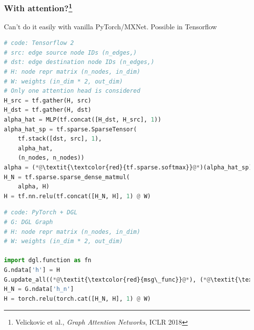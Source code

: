 \documentclass[10pt,aspectratio=169]{beamer}
\begin{document}
	\begin{frame}[fragile]
		\frametitle{With attention?\footnote{Velickovic et al., \emph{Graph Attention Networks}, ICLR 2018}}
		Can't do it easily with vanilla PyTorch/MXNet.  Possible in Tensorflow
		\begin{minipage}{0.5\textwidth}
\begin{lstlisting}[language=Python]
# code: Tensorflow 2
# src: edge source node IDs (n_edges,)
# dst: edge destination node IDs (n_edges,)
# H: node repr matrix (n_nodes, in_dim)
# W: weights (in_dim * 2, out_dim)
# Only one attention head is considered
H_src = tf.gather(H, src)
H_dst = tf.gather(H, dst)
alpha_hat = MLP(tf.concat([H_dst, H_src], 1))
alpha_hat_sp = tf.sparse.SparseTensor(
    tf.stack([dst, src], 1),
    alpha_hat,
    (n_nodes, n_nodes))
alpha = (*@\textit{\textcolor{red}{tf.sparse.softmax}}@*)(alpha_hat_sp)
H_N = tf.sparse.sparse_dense_matmul(
    alpha, H)
H = tf.nn.relu(tf.concat([H_N, H], 1) @ W)
\end{lstlisting}
		\end{minipage}%
		\begin{minipage}{0.5\textwidth}
\begin{lstlisting}[language=Python]
# code: PyTorch + DGL
# G: DGL Graph
# H: node repr matrix (n_nodes, in_dim)
# W: weights (in_dim * 2, out_dim)

import dgl.function as fn
G.ndata['h'] = H
G.update_all((*@\textit{\textcolor{red}{msg\_func}}@*), (*@\textit{\textcolor{red}{reduce\_func}}@*))
H_N = G.ndata['h_n']
H = torch.relu(torch.cat([H_N, H], 1) @ W)
\end{lstlisting}
		\end{minipage}
	\end{frame}
\end{document}
